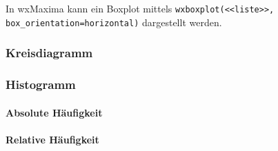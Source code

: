 \documentclass{school}
\begin{document}
In wxMaxima kann ein Boxplot mittels \verb|wxboxplot(<<liste>>, box_orientation=horizontal)| dargestellt werden.

\subsubsection{Kreisdiagramm}
\subsubsection{Histogramm}
\paragraph{Absolute Häufigkeit}
\paragraph{Relative Häufigkeit} 



\end{document}

